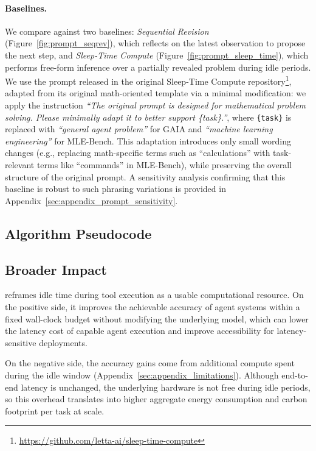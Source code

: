 \paragraph{Baselines.}
\label{sec:appendix_baselines}
We compare \methodname against two baselines: \emph{Sequential Revision} (Figure~\ref{fig:prompt_seqrev}), which reflects on the latest observation to propose the next step, and \emph{Sleep-Time Compute} (Figure~\ref{fig:prompt_sleep_time}), which performs free-form inference over
a partially revealed problem during idle periods. We use the prompt released in the original Sleep-Time Compute repository\footnote{\url{https://github.com/letta-ai/sleep-time-compute}}, adapted from its original math-oriented template via a minimal modification: we apply the instruction
\textit{``The original prompt is designed for mathematical problem solving. Please minimally adapt it to better support \{task\}.''}, where \texttt{\{task\}} is replaced with \emph{``general agent problem''} for GAIA and \emph{``machine learning engineering''} for MLE-Bench. This adaptation introduces only small wording changes (e.g., replacing math-specific terms such as ``calculations'' with task-relevant terms like ``commands'' in MLE-Bench), while preserving the overall structure of the original prompt. A sensitivity analysis confirming that this baseline is robust to such phrasing variations is provided in Appendix~\ref{sec:appendix_prompt_sensitivity}.


\subsection{Algorithm Pseudocode}
\label{sec:appendix_algorithm}


\subsection{Broader Impact}
\label{sec:appendix_broader_impact}
\methodname{} reframes idle time during tool execution as a usable computational 
resource. On the positive side, it improves the achievable accuracy of agent 
systems within a fixed wall-clock budget without modifying the underlying model, 
which can lower the latency cost of capable agent execution and improve 
accessibility for latency-sensitive deployments.

On the negative side, the accuracy gains come from additional compute spent 
during the idle window (Appendix~\ref{sec:appendix_limitations}). Although 
end-to-end latency is unchanged, the underlying hardware is not free during 
idle periods, so this overhead translates into higher aggregate energy 
consumption and carbon footprint per task at scale.

